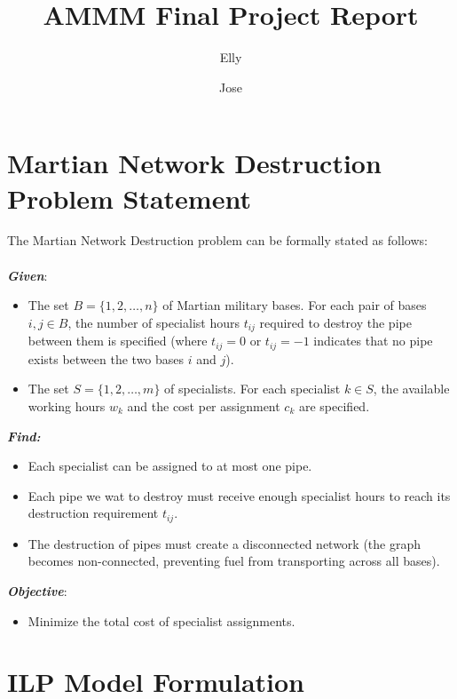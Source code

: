 \documentclass{article}
\title{\textbf{AMMM Final Project Report}}
\author[1]{Elly}
\author[2]{Jose}
\affil[1]{MIRI \href{mailto:@estudiantat.upc.edu}{@estudiantat.upc.edu}}
\affil[2]{MIRI \href{mailto:@estudiantat.upc.edu}{@estudiantat.upc.edu}}
\begin{document}
\maketitle


\tableofcontents

\newpage

\section{Martian Network Destruction Problem Statement}

The Martian Network Destruction problem can be formally stated as follows:\\
\\
\textbf{\textit{Given}}:
\begin{itemize}
    \item The set $B = \{1, 2, \ldots, n\}$ of Martian military bases. For each pair of bases $i, j \in B$, the number of specialist hours $t_{ij}$ required to destroy the pipe between them is specified (where $t_{ij} = 0$ or $t_{ij} = -1$ indicates that no pipe exists between the two bases $i$ and $j$).
    
    \item The set $S = \{1, 2, \ldots, m\}$ of specialists. For each specialist $k \in S$, the available working hours $w_k$ and the cost per assignment $c_k$ are specified.
\end{itemize}

\textbf{\textit{Find:}}
\begin{itemize}
    \item Each specialist can be assigned to at most one pipe.
    
    \item Each pipe we wat to destroy must receive enough specialist hours to reach its destruction requirement $t_{ij}$.
    
    \item The destruction of pipes must create a disconnected network (the graph becomes non-connected, preventing fuel from transporting across all bases).
\end{itemize}

\textbf{\textit{Objective}}:
\begin{itemize}
    \item Minimize the total cost of specialist assignments.
\end{itemize}


\section{ILP Model Formulation}
\end{document}
